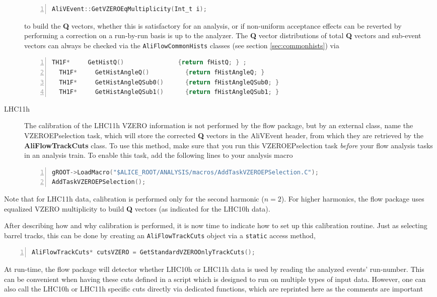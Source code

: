 \documentclass[a4paper]{book}
\numberwithin{equation}{subsection}
\begin{document}
\begin{description}
\begin{lstlisting}[language=C, numbers=left]
AliVEvent::GetVZEROEqMultiplicity(Int_t i);\end{lstlisting}
to build the \textbf{Q} vectors, whether this is satisfactory for an analysis, or if non-uniform acceptance effects can be reverted by performing a correction on a run-by-run basis is up to the analyzer. The \textbf{Q} vector distributions of total \textbf{Q} vectors and sub-event vectors can always be checked via the \texttt{AliFlowCommonHists} classes (see section \ref{sec:commonhists}) via
\begin{lstlisting}[language=C, numbers=left]
  TH1F*     GetHistQ()               {return fHistQ; } ;  
  TH1F*     GetHistAngleQ()          {return fHistAngleQ; }
  TH1F*     GetHistAngleQSub0()      {return fHistAngleQSub0; }
  TH1F*     GetHistAngleQSub1()      {return fHistAngleQSub1; }\end{lstlisting}
\item [LHC11h] The calibration of the LHC11h VZERO information is not performed by the flow package, but by an external class, name the VZEROEPselection task, which will store the corrected \textbf{Q} vectors in the AliVEvent header, from which they are retrieved by the \textbf{AliFlowTrackCuts} class. To use this method, make sure that you run this VZEROEPselection task \emph{before} your flow analysis tasks in an analysis train. To enable this task, add the following lines to your analysis macro
\begin{lstlisting}[language=C, numbers=left]
gROOT->LoadMacro("$ALICE_ROOT/ANALYSIS/macros/AddTaskVZEROEPSelection.C");
AddTaskVZEROEPSelection();\end{lstlisting}
\end{description}
Note that for LHC11h data, calibration is performed only for the second harmonic ($n=2$). For higher harmonics, the flow package uses equalized VZERO multiplicity to build \textbf{Q} vectors (as indicated for the LHC10h data). 

After describing how and why calibration is performed, it is now time to indicate how to set up this calibration routine. Just as selecting barrel tracks, this can be done by creating an \texttt{AliFlowTrackCuts} object via a \texttt{static} access method,
\begin{lstlisting}[language=C, numbers=left]
AliFlowTrackCuts* cutsVZERO = GetStandardVZEROOnlyTrackCuts();\end{lstlisting}
At run-time, the flow package will detector whether LHC10h or LHC11h data is used by reading the analyzed events' run-number. This can be convenient when having these cuts defined in a script which is designed to run on multiple types of input data. However, one can also call the LHC10h or LHC11h specific cuts directly via dedicated functions, which are reprinted here as the comments are important
\end{document}
